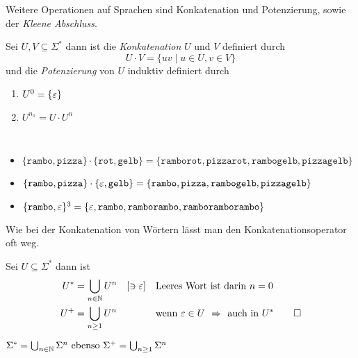 Weitere Operationen auf Sprachen sind Konkatenation und Potenzierung, sowie der \emph{Kleene Abschluss}.
\begin{Def} %
	Sei $U,V\subseteq \Sigma^*$ dann ist die \emph{Konkatenation} $U$ und $V$ definiert durch
	\[ U\cdot V = \{uv \mid u\in U, v\in V \} \]
  und die \emph{Potenzierung} von $U$ induktiv definiert durch
  \begin{enumerate}
  \item $U^0 = \{\varepsilon\}$
  \item $U^{n_1} = U \cdot U^{n}$
  \end{enumerate}
\end{Def}
\begin{Bsp*}~
  \begin{itemize}
  \item $\{\mathtt{rambo}, \mathtt{pizza}\} \cdot \{\mathtt{rot}, \mathtt{gelb}\} = \{\mathtt{ramborot}, \mathtt{pizzarot}, \mathtt{rambogelb}, \mathtt{pizzagelb}\}$
  \item $\{\mathtt{rambo}, \mathtt{pizza}\} \cdot \{\varepsilon, \mathtt{gelb}\} = \{\mathtt{rambo}, \mathtt{pizza}, \mathtt{rambogelb}, \mathtt{pizzagelb}\}$
  \item $\{\mathtt{rambo, \varepsilon}\}^3 = \{\mathtt{\varepsilon}, \mathtt{rambo}, \mathtt{ramborambo}, \mathtt{ramboramborambo}\}$
  \end{itemize}
\end{Bsp*}
Wie bei der Konkatenation von Wörtern lässt man den Konkatenationsoperator oft weg.
%
\begin{Def}
	Sei $U\subseteq\Sigma^*$ dann ist
	\begin{align*}
		U^* &= \bigcup_{n\in\N} U^n \quad [\ni\Eps] && \text{Leeres Wort ist darin }n=0\\
		U^+ &= \bigcup_{n\ge1} U^n && \text{wenn $\Eps\in U$ \=> auch in $U^*$} \qedhere
	\end{align*}
\end{Def}
\begin{Bemerkung}
	$\Sigma^*=\bigcup_{n\in\mathbb{N}}\Sigma^n \text{ ebenso } \Sigma^+ = \bigcup_{n\ge1}\Sigma^n$
\end{Bemerkung}